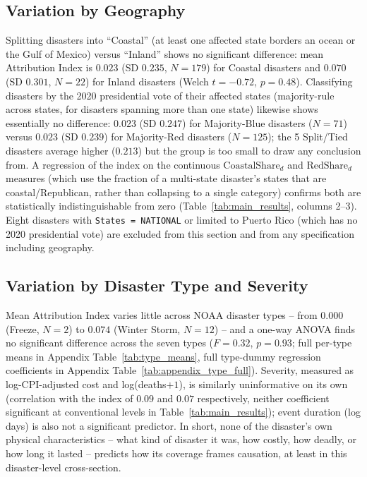 \documentclass[12pt]{article}
\begin{document}
\FloatBarrier
\subsection{Variation by Geography}

Splitting disasters into ``Coastal'' (at least one affected state borders
an ocean or the Gulf of Mexico) versus ``Inland'' shows no significant
difference: mean Attribution Index is $0.023$ (SD $0.235$, $N=179$) for
Coastal disasters and $0.070$ (SD $0.301$, $N=22$) for Inland disasters
(Welch $t=-0.72$, $p=0.48$). Classifying disasters by the 2020 presidential
vote of their affected states (majority-rule across states, for disasters
spanning more than one state) likewise shows essentially no difference:
$0.023$ (SD $0.247$) for Majority-Blue disasters ($N=71$) versus $0.023$
(SD $0.239$) for Majority-Red disasters ($N=125$); the 5 Split/Tied
disasters average higher ($0.213$) but the group is too small to draw any
conclusion from. A regression of the index on the continuous
$\text{CoastalShare}_d$ and $\text{RedShare}_d$ measures (which use the
fraction of a multi-state disaster's states that are coastal/Republican,
rather than collapsing to a single category) confirms both are
statistically indistinguishable from zero (Table~\ref{tab:main_results},
columns 2--3). Eight disasters with \texttt{States = NATIONAL} or limited
to Puerto Rico (which has no 2020 presidential vote) are excluded from this
section and from any specification including geography.

\subsection{Variation by Disaster Type and Severity}

Mean Attribution Index varies little across NOAA disaster types -- from
$0.000$ (Freeze, $N=2$) to $0.074$ (Winter Storm, $N=12$) -- and a one-way
ANOVA finds no significant difference across the seven types ($F=0.32$,
$p=0.93$; full per-type means in Appendix Table~\ref{tab:type_means}, full
type-dummy regression coefficients in Appendix
Table~\ref{tab:appendix_type_full}). Severity, measured as
log-CPI-adjusted cost and log(deaths$+1$), is similarly uninformative on
its own (correlation with the index of $0.09$ and $0.07$ respectively,
neither coefficient significant at conventional levels in
Table~\ref{tab:main_results}); event duration (log days) is also not a
significant predictor. In short, none of the disaster's own physical
characteristics -- what kind of disaster it was, how costly, how deadly, or
how long it lasted -- predicts how its coverage frames causation, at least
in this disaster-level cross-section.
\end{document}
